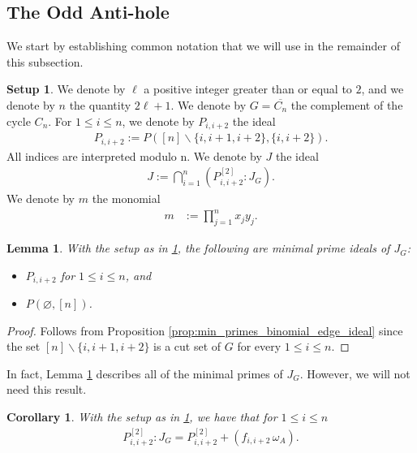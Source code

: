 \documentclass[12pt,a4paper]{amsart}
\theoremstyle{plain}
\newtheorem{cor}[thrm]{Corollary}
\def\bcor{\begin{cor}}
\def\ecor{\end{cor}}
\newtheorem{lem}[thrm]{Lemma}
\def\blem{\begin{lem}}
\def\elem{\end{lem}}
\theoremstyle{definition}
\newtheorem{setup}[thrm]{Setup}
\def\bproof{\begin{proof}}
\def\eproof{\end{proof}}
\theoremstyle{remark}
\let\setminus=\smallsetminus
\begin{document}
\subsection{The Odd Anti-hole}

We start by establishing common notation that we will use in the remainder of this subsection.

\begin{setup}
\label{setup:anti_hole}
We denote by $\ell$ a positive integer greater than or equal to $2$, and we denote by $n$ the quantity $2\ell +1$. We denote by $G = \overline{C_n}$ the complement of the cycle $C_{n}$. For $1 \leq i \leq n$, we denote by $P_{i,i+2}$ the ideal
\begin{align*}
    P_{i,i+2} := P([n]\setminus\{i,i+1,i+2\},\{i,i+2\}).
\end{align*}
All indices are interpreted modulo n.  %
We denote by $J$ the ideal 
\begin{align*}
    J := \bigcap_{i=1}^{n} \left( P_{i,i+2}^{[2]}:J_{G} \right).
\end{align*}
We denote by $m$ the monomial
\begin{align*}
    m &:= \prod_{j=1}^{n} x_{j}y_{j}.
\end{align*}
\end{setup}



\blem
\label{lem:minimal_primes_anti_hole}
With the setup as in \ref{setup:anti_hole}, the following are minimal prime ideals of $J_{G}$: 
\begin{itemize}
\item $P_{i,i+2}$ for $1 \leq i \leq n$, and
\item $P(\varnothing,[n])$.
\end{itemize}
\elem

\bproof
Follows from Proposition \ref{prop:min_primes_binomial_edge_ideal} since the set $[n] \setminus \{i,i+1,i+2\}$ is a cut set of $G$ for every $1 \leq i \leq n$.
\eproof


\noindent In fact, Lemma \ref{lem:minimal_primes_anti_hole} describes all of the minimal primes of $J_{G}$. However, we will not need this result.



\bcor
\label{lem:colon_ideal_of_anti_hole_minl_prime}
With the setup as in \ref{setup:anti_hole}, we have that for $1 \leq i \leq n$ 
\begin{align*}
P_{i,i+2}^{[2]}:J_{G} = P_{i,i+2}^{[2]} + (f_{i,i+2} \, \omega_{A}).
\end{align*}
\ecor 
\end{document}
